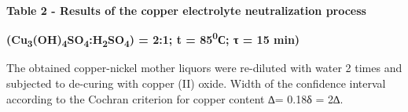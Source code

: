 {\bfseries Table 2 - Results of the copper electrolyte neutralization
process}

{\bfseries (Cu\textsubscript{3}(OH)\textsubscript{4}SO\textsubscript{4}:H\textsubscript{2}SO\textsubscript{4})
= 2:1; t = 85\textsuperscript{0}С; τ = 15 min)}


The obtained copper-nickel mother liquors were re-diluted with water 2
times and subjected to de-curing with copper (II) oxide. Width of the
confidence interval according to the Cochran criterion for copper
content ∆= 0.18δ = 2∆.

